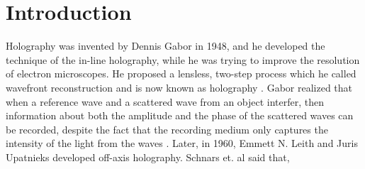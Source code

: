 %
%

\chapter{Introduction} \label{chap:Intro}

Holography was invented by Dennis Gabor in 1948, and he developed the technique
of the in-line holography, while he was trying to improve the resolution of
electron microscopes. He proposed a lensless, two-step process which he called
wavefront reconstruction and is now known as holography .
Gabor realized that when a reference wave and a scattered wave from an object
interfer, then information about both the amplitude and the phase of the
scattered waves can be recorded, despite the fact that the recording medium
only captures the intensity of the light from the waves \cite{Goodman}.
Later, in 1960, Emmett N. Leith and Juris Upatnieks developed
off-axis holography. Schnars et. al said that,

